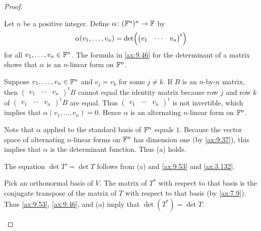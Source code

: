 \begin{proof}\leavevmode
\begin{parts}
\item Let $n$ be a positive integer. Define $\alpha\colon(\F^n)^n\to\F$ by
  \[ \alpha(v_1,\dots,v_n)
     = \det\Bigl(\begin{pmatrix} v_1 & \cdots & v_n \end{pmatrix}^{\mathrm{t}}\Bigr) \]
  for all $v_1,\dots,v_n\in\F^n$. The formula in \ref{ax:9.46} for the
  determinant of a matrix shows that $\alpha$ is an $n$-linear form on $\F^n$.

  Suppose $v_1,\dots,v_n\in\F^n$ and $v_j=v_k$ for some $j\ne k$. If $B$ is an
  $n$-by-$n$ matrix, then
  $\begin{pmatrix} v_1 & \cdots & v_n \end{pmatrix}^{\mathrm{t}}B$ cannot equal
  the identity matrix because row $j$ and row $k$ of
  $\begin{pmatrix} v_1 & \cdots & v_n \end{pmatrix}^{\mathrm{t}}B$ are equal.
  Thus $\begin{pmatrix} v_1 & \cdots & v_n \end{pmatrix}^{\mathrm{t}}$ is not
  invertible, which implies that $\alpha(v_1,\dots,v_n)=0$. Hence $\alpha$ is
  an alternating $n$-linear form on $\F^n$.

  Note that $\alpha$ applied to the standard basis of $\F^n$ equals $1$.
  Because the vector space of alternating $n$-linear forms on $\F^n$ has
  dimension one (by \ref{ax:9.37}), this implies that $\alpha$ is the
  determinant function. Thus (a) holds.
\item The equation $\det T'=\det T$ follows from (a) and \ref{ax:9.53} and
  \ref{ax:3.132}.
\item Pick an orthonormal basis of $V$. The matrix of $T^*$ with respect to
  that basis is the conjugate transpose of the matrix of $T$ with respect to
  that basis (by \ref{ax:7.9}). Thus \ref{ax:9.53}, \ref{ax:9.46}, and (a)
  imply that $\det(T^*)=\overline{\det T}$. \qedhere
\end{parts}
\end{proof}

